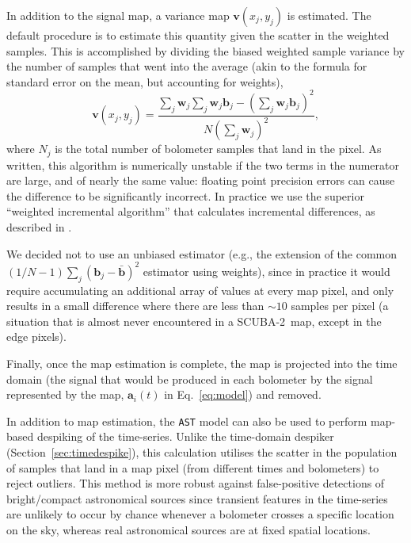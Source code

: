 \documentclass[useAMS,usenatbib,nofootinbib]{mn2e}
\newcommand{\scuba}{SCUBA-2}
\newcommand{\model}[1]{\texttt{#1}}
\begin{document}
In addition to the signal map, a variance map $\mathbf{v}(x_j,y_j)$ is
estimated. The default procedure is to estimate this quantity given
the scatter in the weighted samples. This is accomplished by dividing
the biased weighted sample variance by the number of samples that went
into the average (akin to the formula for standard error on the mean,
but accounting for weights),
%
\begin{equation}
\label{eq:varmap}
\mathbf{v}(x_j,y_j) = \frac{\sum_j \mathbf{w}_j
                            \sum_j \mathbf{w}_j \mathbf{b}_j -
                            \left( \sum_j \mathbf{w}_j \mathbf{b}_j \right)^2 }
                           { N \left( \sum_j \mathbf{w}_j \right)^2 },
\end{equation}
%
where $N_j$ is the total number of bolometer samples that land in the
pixel. As written, this algorithm is numerically unstable if the two
terms in the numerator are large, and of nearly the same value:
floating point precision errors can cause the difference to be
significantly incorrect. In practice we use the superior ``weighted
incremental algorithm'' that calculates incremental differences, as
described in \citet{west1979}.

We decided not to use an unbiased estimator (e.g., the extension of
the common $(1/N-1)\sum_j (\mathbf{b}_j - \bar{\mathbf{b}})^2$
estimator using weights), since in practice it would require
accumulating an additional array of values at every map pixel, and
only results in a small difference where there are less than $\sim10$
samples per pixel (a situation that is almost never encountered in a
\scuba\ map, except in the edge pixels).

Finally, once the map estimation is complete, the map is projected
into the time domain (the signal that would be produced in each
bolometer by the signal represented by the map, $\mathbf{a}_i(t)$ in
Eq.~\ref{eq:model}) and removed.

In addition to map estimation, the \model{AST} model can also be used
to perform map-based despiking of the time-series. Unlike the
time-domain despiker (Section~\ref{sec:timedespike}), this calculation
utilises the scatter in the population of samples that land in a map
pixel (from different times and bolometers) to reject outliers. This
method is more robust against false-positive detections of
bright/compact astronomical sources since transient features in the
time-series are unlikely to occur by chance whenever a bolometer
crosses a specific location on the sky, whereas real astronomical
sources are at fixed spatial locations.
\end{document}
